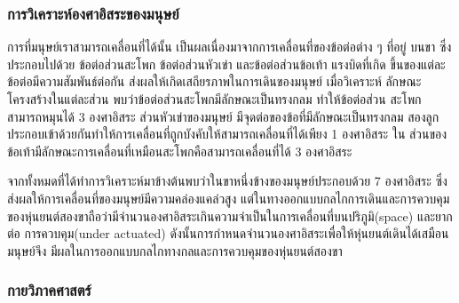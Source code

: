 \subsubsection{การวิเคราะห์องศาอิสระของมนุษย์}
การที่มนุษย์เราสามารถเคลื่อนที่ได้นั้น เป็นผลเนื่องมาจากการเคลื่อนที่ของข้อต่อต่าง ๆ ที่อยู่
บนขา ซึ่งประกอบไปด้วย ข้อต่อส่วนสะโพก ข้อต่อส่วนหัวเข่า และข้อต่อส่วนข้อเท้า แรงบิดที่เกิด
ขึ้นของแต่ละข้อต่อมีความสัมพันธ์ต่อกัน ส่งผลให้เกิดเสถียรภาพในการเดินของมนุษย์ เมื่อวิเคราะห์
ลักษณะโครงสร้างในแต่ละส่วน พบว่าข้อต่อส่วนสะโพกมีลักษณะเป็นทรงกลม ทำให้ข้อต่อส่วน
สะโพกสามารถหมุนได้ 3 องศาอิสระ ส่วนหัวเข่าของมนุษย์ มีจุดต่อของข้อที่มีลักษณะเป็นทรงกลม
สองลูกประกอบเข้าด้วยกันทำให้การเคลื่อนที่ถูกบังคับให้สามารถเคลื่อนที่ได้เพียง 1 องศาอิสระ ใน
ส่วนของข้อเท้ามีลักษณะการเคลื่อนที่เหมือนสะโพกคือสามารถเคลื่อนที่ได้ 3 องศาอิสระ

จากทั้งหมดที่ได้ทำการวิเคราะห์มาข้างต้นพบว่าในขาหนึ่งข้างของมนุษย์ประกอบด้วย 7 องศาอิสระ
ซึ่งส่งผลให้การเคลื่อนที่ของมนุษย์มีความคล่องแคล่วสูง แต่ในทางออกแบบกลไกการเดินและการควบคุม
ของหุ่นยนต์สองขาถือว่ามีจำนวนองศาอิสระเกินความจำเป็นในการเคลื่อนที่บนปริภูมิ(space) และยากต่อ
การควบคุม(under actuated) ดังนั้นการกำหนดจำนวนองศาอิสระเพื่อให้หุ่นยนต์เดินได้เสมือนมนุษย์จึง
มีผลในการออกแบบกลไกทางกลและการควบคุมของหุ่นยนต์สองขา 

\subsubsection{กายวิภาคศาสตร์}
